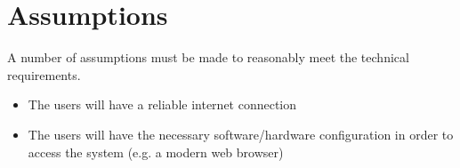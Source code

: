 \section{Assumptions} \label{section:probart-assumptions}
A number of assumptions must be made to reasonably meet the technical requirements.

\begin{itemize}
    \item The users will have a reliable internet connection
    \item The users will have the necessary software/hardware configuration in order to access the system (e.g. a modern web browser)
\end{itemize}